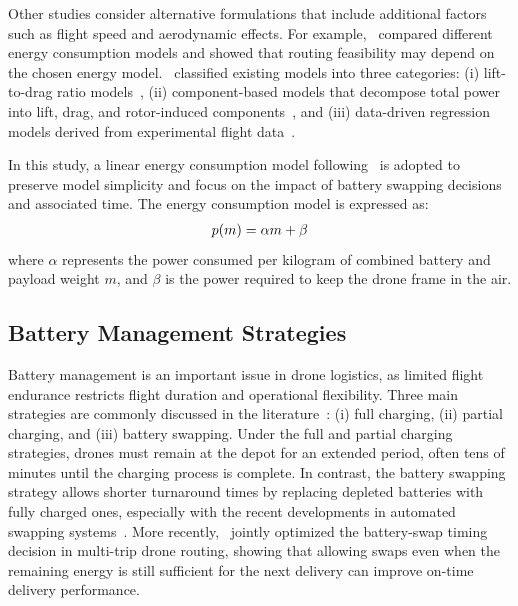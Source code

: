 \documentclass[3p, authoryear, 11pt]{elsarticle}
\begin{document}
Other studies consider alternative formulations that include additional factors such as flight speed and aerodynamic effects. For example,~\citet{cheng_drone_2020} compared different energy consumption models and showed that routing feasibility may depend on the chosen energy model.~\citet{zhang_energy_2021} classified existing models into three categories: 
(i) lift-to-drag ratio models~\citep{dandrea_guest_2014}, 
(ii) component-based models that decompose total power into lift, drag, and rotor-induced components~\citep{dorling_vehicle_2017,stolaroff_energy_2018,liu_power_2017}, and 
(iii) data-driven regression models derived from experimental flight data~\citep{tseng_flight_2017,alyassi_autonomous_2017}. 

In this study, a linear energy consumption model following~\citet{dorling_vehicle_2017} is adopted to preserve model simplicity and focus on the impact of battery swapping decisions and associated time. The energy consumption model is expressed as:
\begin{align}
    p(m) = \alpha m + \beta \notag
    \label{eq:01}
\end{align}
where $\alpha$ represents the power consumed per kilogram of combined battery and payload weight $m$, and $\beta$ is the power required to keep the drone frame in the air.

\subsection{Battery Management Strategies}

Battery management is an important issue in drone logistics, as limited flight endurance restricts flight duration and operational flexibility. 
Three main strategies are commonly discussed in the literature~\citep{liu_integrating_2025}: 
(i) full charging, 
(ii) partial charging, and 
(iii) battery swapping. 
Under the full and partial charging strategies, drones must remain at the depot for an extended period, often tens of minutes until the charging process is complete. 
In contrast, the battery swapping strategy allows shorter turnaround times by replacing depleted batteries with fully charged ones, especially with the recent developments in automated swapping systems~\citep{vilkki_automatic_2024,hoang_design_2024}. More recently,~\citet{liu_ondemand_2026} jointly optimized the battery-swap timing decision in multi-trip drone routing, showing that allowing swaps even when the remaining energy is still sufficient for the next delivery can improve on-time delivery performance.
\end{document}
